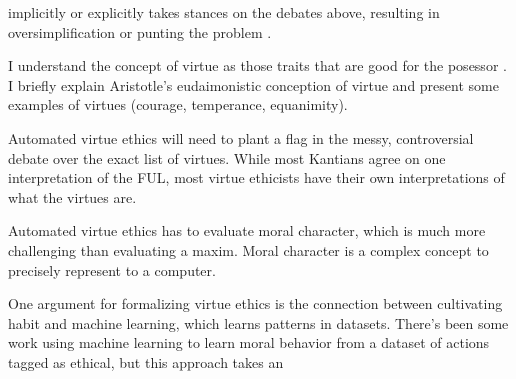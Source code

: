 \begin{isabellebody}
\begin{isamarkuptext}
implicitly or explicitly takes stances on the debates above, resulting in oversimplification or 
punting the problem \cite{util1, util2}.%
\end{isamarkuptext}\isamarkuptrue%
%
\isadelimdocument
%
\endisadelimdocument
%
\isatagdocument
%
\isamarkuptrue%
%
\isamarkuptrue%
%
\endisatagdocument
{\isafolddocument}%
%
\isadelimdocument
%
\endisadelimdocument
%
\begin{isamarkuptext}%
I understand the concept of virtue as those traits that are good for the posessor \cite{vesep}. 
I briefly explain Aristotle's eudaimonistic conception of virtue and present some examples of virtues 
(courage, temperance, equanimity).%
\end{isamarkuptext}\isamarkuptrue%
%
\isadelimdocument
%
\endisadelimdocument
%
\isatagdocument
%
\isamarkuptrue%
%
\isamarkuptrue%
%
\endisatagdocument
{\isafolddocument}%
%
\isadelimdocument
%
\endisadelimdocument
%
\begin{isamarkuptext}%
Automated virtue ethics will need to plant a flag in the messy, controversial debate over the 
exact list of virtues. While most Kantians agree on one interpretation of the FUL, most virtue ethicists 
have their own interpretations of what the virtues are.%
\end{isamarkuptext}\isamarkuptrue%
%
\isadelimdocument
%
\endisadelimdocument
%
\isatagdocument
%
\isamarkuptrue%
%
\endisatagdocument
{\isafolddocument}%
%
\isadelimdocument
%
\endisadelimdocument
%
\begin{isamarkuptext}%
Automated virtue ethics has to evaluate moral character, which is much more challenging than 
evaluating a maxim. Moral character is a complex concept to precisely represent to a computer.%
\end{isamarkuptext}\isamarkuptrue%
%
\isadelimdocument
%
\endisadelimdocument
%
\isatagdocument
%
\isamarkuptrue%
%
\endisatagdocument
{\isafolddocument}%
%
\isadelimdocument
%
\endisadelimdocument
%
\begin{isamarkuptext}%
One argument for formalizing virtue ethics is the connection between cultivating habit
and machine learning, which learns patterns in datasets. There's been some work using machine learning 
to learn moral behavior from a dataset of actions tagged as ethical, but this approach takes an

\end{isamarkuptext}
\end{isabellebody}
